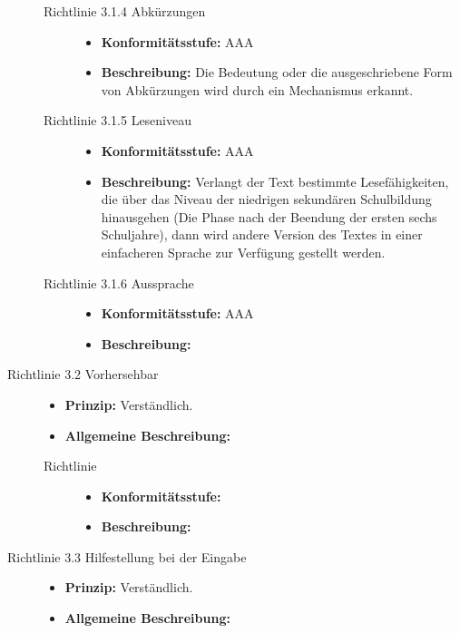 \begin{description}
\begin{description}
		\item[Richtlinie 3.1.4 Abkürzungen]\hfill
		\begin{itemize}
			\item \textbf{Konformitätsstufe:} AAA
			\item \textbf{Beschreibung:} Die Bedeutung oder die ausgeschriebene Form von Abkürzungen wird durch ein Mechanismus erkannt.
		\end{itemize}
		
		\item[Richtlinie 3.1.5 Leseniveau]\hfill
		\begin{itemize}
			\item \textbf{Konformitätsstufe:} AAA
			\item \textbf{Beschreibung:} Verlangt der Text bestimmte Lesefähigkeiten, die über das Niveau der niedrigen sekundären Schulbildung hinausgehen (Die 
			Phase nach der Beendung der ersten sechs Schuljahre), dann wird andere Version des Textes in einer einfacheren Sprache zur Verfügung gestellt werden.
		\end{itemize}
		
		\item[Richtlinie 3.1.6 Aussprache]\hfill
		\begin{itemize}
			\item \textbf{Konformitätsstufe:} AAA
			\item \textbf{Beschreibung:} 
		\end{itemize}
	\end{description}

	\item[Richtlinie 3.2 Vorhersehbar]\hfill
	\begin{itemize}
		\item \textbf{Prinzip:} Verständlich.
		\item \textbf{Allgemeine Beschreibung:} 
	\end{itemize}
	
	\begin{description}
		\item[Richtlinie ]\hfill
		\begin{itemize}
			\item \textbf{Konformitätsstufe:}
			\item \textbf{Beschreibung:}
		\end{itemize}
	\end{description}

	\item[Richtlinie 3.3 Hilfestellung bei der Eingabe]\hfill
	\begin{itemize}
		\item \textbf{Prinzip:} Verständlich.
		\item \textbf{Allgemeine Beschreibung:} 
	\end{itemize}
	

\end{description}
